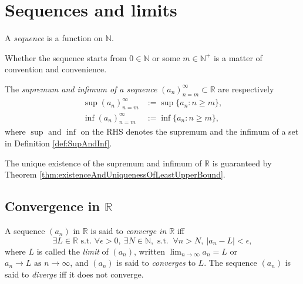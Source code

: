 
\section{Sequences and limits}
\label{sec:sequences}

\begin{defn}
  A \emph{sequence} is a function on $\mathbb{N}$.
\end{defn}

\begin{rem}
  Whether the sequence starts from $0\in\mathbb{N}$
  or some $m\in \mathbb{N}^+$
  is a matter of convention and convenience.
\end{rem}

\begin{defn}
  The \emph{supremum and infimum of a sequence}
  $(a_n)_{n=m}^{\infty}\subset \mathbb{R}$ are respectively 
  \begin{align}
    \label{eq:supSequence}
    \sup(a_n)_{n=m}^{\infty}
    &:= \sup \{a_n: n\ge m\},
    \\
    \label{eq:infSequence}
    \inf(a_n)_{n=m}^{\infty}
    &:= \inf \{a_n: n\ge m\},
  \end{align}
  where $\sup$ and $\inf$ on the RHS
  denotes the supremum and the infimum of a set
  in Definition \ref{def:SupAndInf}. 
\end{defn}

\begin{rem}
  The unique existence of the supremum and infimum of $\mathbb{R}$
  is guaranteed by Theorem \ref{thm:existenceAndUniquenessOfLeastUpperBound}.
\end{rem}


\subsection{Convergence in $\mathbb{R}$}
\label{sec:convergenceOfSequenceInR}

\begin{defn}
  \label{def:limitOfSequence}
  A sequence $(a_n)$ in $\mathbb{R}$
  is said to \emph{converge in $\mathbb{R}$} iff
  \begin{equation}
    \label{eq:limitOfSequence}
    \exists L\in \mathbb{R} \text{ s.t. }  
    \forall \epsilon>0,\ \exists N\in \mathbb{N}, \text{ s.t. }\ 
    \forall n>N, \ |a_n-L| < \epsilon, 
  \end{equation}
  where $L$ is called the \emph{limit} of $(a_n)$, 
  written $\lim_{n\rightarrow \infty} a_n = L$
  or 
  \mbox{$a_n\rightarrow L \text{ as } n\rightarrow\infty$}, 
  and $(a_n)$ is said to \emph{converges} to $L$.
  The sequence $(a_n)$ is said to \emph{diverge}
  iff it does not converge.
\end{defn}


